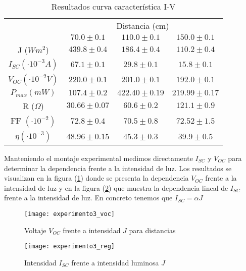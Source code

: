 \begin{table}[t]
	\centering
	\begin{adjustwidth}{-2cm}{}
	\begin{tabular}{cccc}
		\toprule
		\multicolumn{1}{c}{} & \multicolumn{3}{c}{Distancia (cm)} \\
		\cmidrule(r){2-4}
		& $70.0 \pm 0.1$    & $110.0 \pm 0.1$    & $150.0 \pm 0.1$ \\
		\midrule
		J ($Wm^2$) & $439.8 \pm 0.4$    & $186.4 \pm 0.4$    & $110.2 \pm 0.4$ \\
		$I_{SC} (\cdot 10^{-3}A)$ & $67.1 \pm 0.1$    & $29.8 \pm 0.1$    & $15.8 \pm 0.1$ \\
		$V_{OC} (\cdot 10^{-2}V)$ & $220.0 \pm 0.1$    & $201.0 \pm 0.1$    & $192.0 \pm 0.1$ \\
		$P_{max} (mW)$ & $107.4 \pm 0.2$    & $422.40 \pm 0.19$    & $219.99 \pm 0.17$ \\
		R ($\Omega$) & $30.66 \pm 0.07$    & $60.6 \pm 0.2$    & $121.1 \pm 0.9$ \\
		FF $(\cdot 10^{-2})$ & $72.8 \pm 0.4$    & $70.5 \pm 0.8$    & $72.52 \pm 1.5$ \\
		$\eta (\cdot 10^{-3})$ & $48.96 \pm 0.15$    & $45.3 \pm 0.3$    & $39.9 \pm 0.5$ \\
		\bottomrule
	\end{tabular}
	\caption{Resultados curva característica I-V}
	\label{table_exp2}
\end{adjustwidth}
\end{table}

Manteniendo el montaje experimental medimos directamente $I_{SC}$ y $V_{OC}$ para determinar la dependencia frente a la intensidad de luz. Los resultados se visualizan en la figura (\ref{figure_exp3_voc}) donde se presenta la dependencia $V_{OC}$ frente a la intensidad de luz y en la figura (\ref{figure_exp3_reg}) que muestra la dependencia lineal de $I_{SC}$ frente a la intensidad de luz. En concreto tenemos que $I_{SC} = \alpha J$

\begin{figure}[t]
	\texttt{[image: experimento3\_voc]}
	\caption{Voltaje $V_{OC}$ frente a intensidad $J$ para distancias}
	\label{figure_exp3_voc}
\end{figure}

\begin{figure}[t]
	\texttt{[image: experimento3\_reg]}
	\caption{Intensidad $I_{SC}$ frente a intensidad luminosa $J$}
	\label{figure_exp3_reg}
\end{figure}

